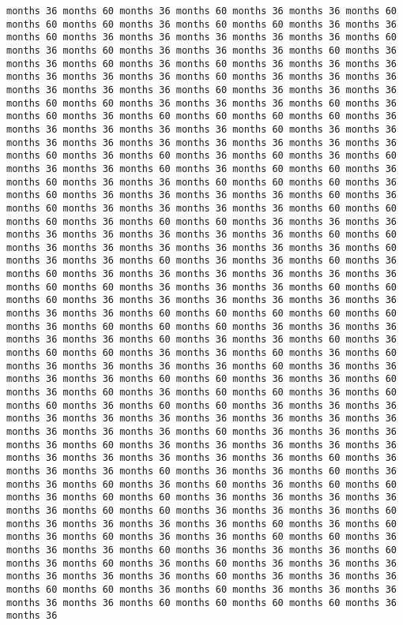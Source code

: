 \documentclass[11pt]{article}
\begin{document}
\begin{Verbatim}[commandchars=\\\{\}, frame=single, framerule=2mm, rulecolor=\color{outerrorbackground}]
months 36 months 60 months 36 months 60 months 36 months 36 months 60 months 60 months 60 months 36 months 60 months 60 months 36 months 36 months 60 months 36 months 36 months 36 months 36 months 36 months 60 months 36 months 60 months 36 months 36 months 36 months 60 months 36 months 36 months 60 months 36 months 60 months 36 months 36 months 36 months 36 months 36 months 36 months 60 months 36 months 36 months 36 months 36 months 36 months 36 months 60 months 36 months 36 months 36 months 60 months 60 months 36 months 36 months 36 months 60 months 36 months 60 months 36 months 60 months 60 months 60 months 60 months 36 months 36 months 36 months 36 months 36 months 60 months 36 months 36 months 36 months 36 months 36 months 36 months 36 months 36 months 36 months 60 months 36 months 60 months 36 months 60 months 36 months 60 months 36 months 36 months 60 months 36 months 60 months 60 months 36 months 60 months 36 months 36 months 60 months 60 months 60 months 36 months 60 months 36 months 36 months 36 months 36 months 60 months 36 months 60 months 36 months 36 months 36 months 36 months 60 months 60 months 60 months 36 months 60 months 60 months 36 months 36 months 36 months 36 months 36 months 36 months 36 months 36 months 60 months 60 months 36 months 36 months 36 months 36 months 36 months 36 months 60 months 36 months 36 months 60 months 36 months 36 months 60 months 36 months 60 months 36 months 36 months 36 months 36 months 36 months 36 months 60 months 60 months 36 months 36 months 36 months 60 months 60 months 60 months 36 months 36 months 36 months 36 months 36 months 36 months 36 months 36 months 60 months 60 months 60 months 60 months 60 months 36 months 60 months 60 months 60 months 36 months 36 months 36 months 36 months 36 months 60 months 36 months 36 months 60 months 36 months 60 months 60 months 36 months 36 months 60 months 36 months 60 months 36 months 36 months 36 months 36 months 60 months 36 months 36 months 36 months 36 months 60 months 60 months 36 months 36 months 60 months 36 months 60 months 36 months 60 months 60 months 36 months 60 months 60 months 36 months 60 months 60 months 36 months 36 months 36 months 36 months 36 months 36 months 36 months 36 months 36 months 36 months 36 months 36 months 36 months 60 months 36 months 36 months 36 months 36 months 60 months 36 months 36 months 36 months 36 months 36 months 36 months 36 months 36 months 36 months 36 months 60 months 36 months 36 months 36 months 60 months 36 months 36 months 60 months 36 months 36 months 60 months 36 months 60 months 36 months 60 months 60 months 36 months 60 months 60 months 36 months 36 months 36 months 36 months 36 months 60 months 60 months 36 months 36 months 36 months 60 months 36 months 36 months 36 months 36 months 60 months 36 months 60 months 36 months 60 months 36 months 36 months 60 months 60 months 36 months 36 months 36 months 60 months 36 months 36 months 36 months 60 months 36 months 60 months 36 months 60 months 36 months 36 months 36 months 36 months 36 months 36 months 60 months 36 months 36 months 36 months 60 months 60 months 36 months 60 months 36 months 36 months 36 months 36 months 36 months 60 months 60 months 60 months 60 months 36 months 36 
\end{Verbatim}
\end{document}
